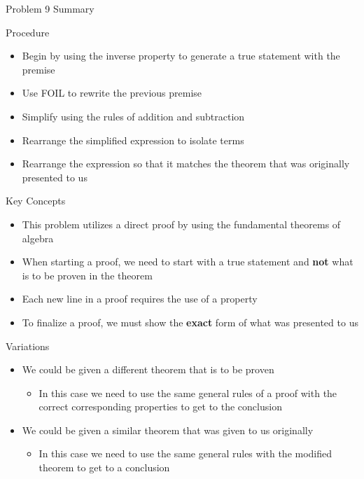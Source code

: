 \begin{summary}{Problem 9 Summary}
    \begin{statement}{Procedure}
        \begin{itemize}
            \item Begin by using the inverse property to generate a true statement with the premise
            \item Use FOIL to rewrite the previous premise
            \item Simplify using the rules of addition and subtraction
            \item Rearrange the simplified expression to isolate terms
            \item Rearrange the expression so that it matches the theorem that was originally presented to us
        \end{itemize}
    \end{statement}
    \begin{statement}{Key Concepts}
        \begin{itemize}
            \item This problem utilizes a direct proof by using the fundamental theorems of algebra
            \item When starting a proof, we need to start with a true statement and \textbf{not} what is to be proven in the theorem
            \item Each new line in a proof requires the use of a property
            \item To finalize a proof, we must show the \textbf{exact} form of what was presented to us
        \end{itemize}
    \end{statement}
    \begin{statement}{Variations}
        \begin{itemize}
            \item We could be given a different theorem that is to be proven
            \begin{itemize}
                \item In this case we need to use the same general rules of a proof with the correct corresponding properties to get to the conclusion
            \end{itemize}
            \item We could be given a similar theorem that was given to us originally
            \begin{itemize}
                \item In this case we need to use the same general rules with the modified theorem to get to a conclusion
            \end{itemize}
        \end{itemize}
    \end{statement}
\end{summary}

